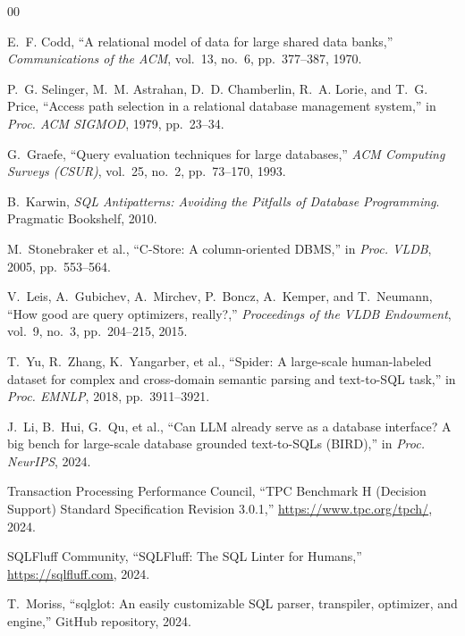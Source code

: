 \documentclass[conference]{IEEEtran}
\begin{document}
\begin{thebibliography}{00}

E.~F. Codd, ``A relational model of data for large shared data banks,'' \textit{Communications of the ACM}, vol.~13, no.~6, pp.~377--387, 1970.

P.~G. Selinger, M.~M. Astrahan, D.~D. Chamberlin, R.~A. Lorie, and T.~G. Price, ``Access path selection in a relational database management system,'' in \textit{Proc. ACM SIGMOD}, 1979, pp.~23--34.

G.~Graefe, ``Query evaluation techniques for large databases,'' \textit{ACM Computing Surveys (CSUR)}, vol.~25, no.~2, pp.~73--170, 1993.

B.~Karwin, \textit{SQL Antipatterns: Avoiding the Pitfalls of Database Programming}. Pragmatic Bookshelf, 2010.

M.~Stonebraker et al., ``C-Store: A column-oriented DBMS,'' in \textit{Proc. VLDB}, 2005, pp.~553--564.

V.~Leis, A.~Gubichev, A.~Mirchev, P.~Boncz, A.~Kemper, and T.~Neumann, ``How good are query optimizers, really?,'' \textit{Proceedings of the VLDB Endowment}, vol.~9, no.~3, pp.~204--215, 2015.

T.~Yu, R.~Zhang, K.~Yangarber, et al., ``Spider: A large-scale human-labeled dataset for complex and cross-domain semantic parsing and text-to-SQL task,'' in \textit{Proc. EMNLP}, 2018, pp.~3911--3921.

J.~Li, B.~Hui, G.~Qu, et al., ``Can LLM already serve as a database interface? A big bench for large-scale database grounded text-to-SQLs (BIRD),'' in \textit{Proc. NeurIPS}, 2024.

Transaction Processing Performance Council, ``TPC Benchmark H (Decision Support) Standard Specification Revision 3.0.1,'' \url{https://www.tpc.org/tpch/}, 2024.

SQLFluff Community, ``SQLFluff: The SQL Linter for Humans,'' \url{https://sqlfluff.com}, 2024.

T.~Moriss, ``sqlglot: An easily customizable SQL parser, transpiler, optimizer, and engine,'' GitHub repository, 2024.

\end{thebibliography}
\end{document}

